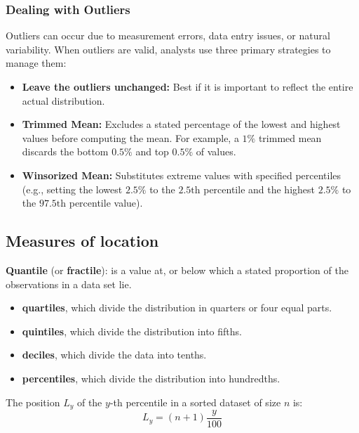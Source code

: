 \subsubsection{Dealing with Outliers}
Outliers can occur due to measurement errors, data entry issues, or natural variability. When outliers are valid, analysts use three primary strategies to manage them:
\begin{itemize}
	\item \textbf{Leave the outliers unchanged:} Best if it is important to reflect the entire actual distribution.
	\item \textbf{Trimmed Mean:} Excludes a stated percentage of the lowest and highest values before computing the mean. For example, a $1\%$ trimmed mean discards the bottom $0.5\%$ and top $0.5\%$ of values.
	\item \textbf{Winsorized Mean:} Substitutes extreme values with specified percentiles (e.g., setting the lowest $2.5\%$ to the $2.5\text{th}$ percentile and the highest $2.5\%$ to the $97.5\text{th}$ percentile value).
\end{itemize}

\subsection{Measures of location}
	\label{subsec:Quantiles}
\textbf{Quantile} (or \textbf{fractile}): is a value at, or below which a stated proportion of the observations in a data set lie.
\begin{itemize}
	\item[-] \textbf{quartiles}, which divide the distribution in quarters or four equal parts.
	\item[-] \textbf{quintiles}, which divide the distribution into fifths.
	\item[-] \textbf{deciles}, which divide the data into tenths.
	\item[-] \textbf{percentiles}, which divide the distribution into hundredths.
\end{itemize}
The position $L_y$ of the $y$-th percentile in a sorted dataset of size $n$ is:
\begin{equation}
	L_y = (n + 1) \frac{y}{100}
	\label{eq:percentile_position_m5}
\end{equation}

